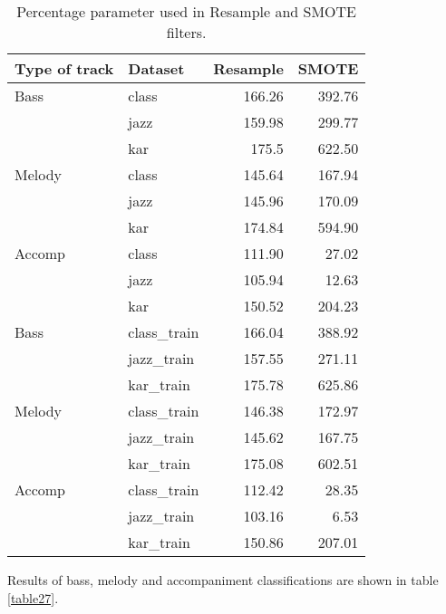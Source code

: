 \documentclass{article}
\begin{document}
\begin{table}
\small
\begin{center}
\begin{tabular}{  l | l | r | r }
\hline
Type of track & Dataset & Resample & SMOTE \\
\hline
\hline
Bass & class & 166.26 & 392.76 \\
 & jazz & 159.98 & 299.77 \\
 & kar & 175.5 & 622.50 \\
\hline
Melody & class & 145.64 & 167.94 \\
 & jazz & 145.96 & 170.09 \\
 & kar & 174.84 & 594.90 \\
\hline
Accomp & class & 111.90 & 27.02 \\
 & jazz & 105.94 & 12.63 \\
 & kar & 150.52 & 204.23 \\
\hline
\hline
Bass & class\_train & 166.04 & 388.92 \\
 & jazz\_train & 157.55 & 271.11 \\
 & kar\_train & 175.78 & 625.86 \\
\hline
Melody & class\_train & 146.38 & 172.97 \\
 & jazz\_train & 145.62 & 167.75 \\
 & kar\_train & 175.08 & 602.51 \\
\hline
Accomp & class\_train & 112.42 & 28.35 \\
 & jazz\_train & 103.16 & 6.53 \\
 & kar\_train & 150.86 & 207.01 \\
\hline
\end{tabular}
\caption{Percentage parameter used in Resample and SMOTE filters.}
\label{table26}
\end{center}
\end{table}



Results of bass, melody and accompaniment classifications are shown in table \ref{table27}.
\end{document}
